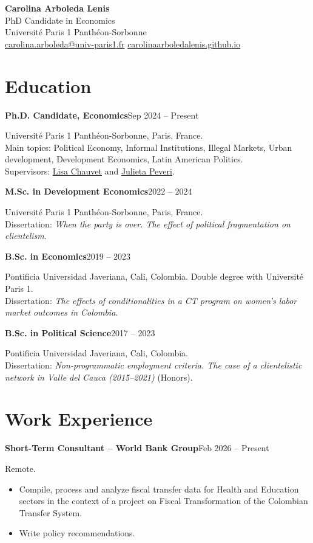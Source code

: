 \documentclass[10pt,a4paper]{article}
\newcommand{\entry}[2]{\textbf{#1}\hfill #2\par}
\begin{document}
\begin{center}
{\LARGE\bfseries Carolina Arboleda Lenis}\\[4pt]
PhD Candidate in Economics\\[2pt]
Université Paris 1 Panthéon-Sorbonne\\[4pt]
\href{mailto:carolina.arboleda@univ-paris1.fr}{carolina.arboleda@univ-paris1.fr}
\quad\textbar\quad
\href{https://carolinaarboledalenis.github.io/}{carolinaarboledalenis.github.io}
\end{center}

\section{Education}
\entry{Ph.D. Candidate, Economics}{Sep 2024 -- Present}
Université Paris 1 Panthéon-Sorbonne, Paris, France.\\
Main topics: Political Economy, Informal Institutions, Illegal Markets, Urban development, Development Economics, Latin American Politics.\\
Supervisors: \href{https://sites.google.com/site/lisachauvetdial/home}{Lisa Chauvet} and \href{https://sites.google.com/view/julietapeveri}{Julieta Peveri}.

\entry{M.Sc. in Development Economics}{2022 -- 2024}
Université Paris 1 Panthéon-Sorbonne, Paris, France.\\
Dissertation: \emph{When the party is over. The effect of political fragmentation on clientelism}.

\entry{B.Sc. in Economics}{2019 -- 2023}
Pontificia Universidad Javeriana, Cali, Colombia. Double degree with Université Paris 1.\\
Dissertation: \emph{The effects of conditionalities in a CT program on women's labor market outcomes in Colombia}.

\entry{B.Sc. in Political Science}{2017 -- 2023}
Pontificia Universidad Javeriana, Cali, Colombia.\\
Dissertation: \emph{Non-programmatic employment criteria. The case of a clientelistic network in Valle del Cauca (2015--2021)} (Honors).

\section{Work Experience}
\entry{Short-Term Consultant -- World Bank Group}{Feb 2026 -- Present}
Remote.
\begin{itemize}
\item Compile, process and analyze fiscal transfer data for Health and Education sectors in the context of a project on Fiscal Transformation of the Colombian Transfer System.
\item Write policy recommendations.
\end{itemize}
\end{document}
